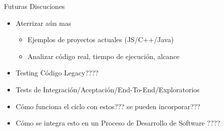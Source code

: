 
\begin{frame}{Futuras Discuciones}
    \begin{itemize}
        \item Aterrizar aún mas
        \begin{itemize}
            \item Ejemplos de proyectos actuales (JS/C++/Java)
            \item Analizar código real, tiempo de ejecución, alcance
        \end{itemize}
        \item Testing Código Legacy????
        \item Tests de Integración/Aceptación/End-To-End/Exploratorios
        \item Cómo funciona el ciclo con estos??? se pueden incorporar???
        \item Cómo se integra esto en un Proceso de Desarrollo de Software ????
    \end{itemize}
\end{frame}
